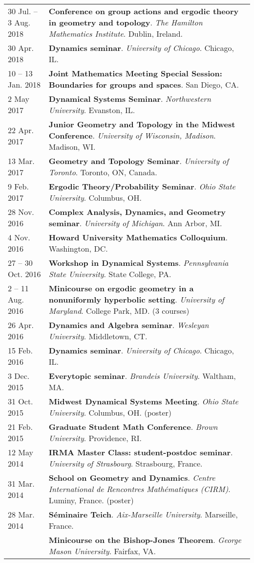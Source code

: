 \begin{center}
{\begin{longtable}{p{}  p{}}
30 Jul.  -- 3 Aug.  2018 & \textbf{Conference on group actions and ergodic theory in geometry and topology}. \textit{The Hamilton Mathematics Institute}.  Dublin, Ireland.  \\ 
30 Apr.  2018 & \textbf{Dynamics seminar}. \textit{University of Chicago}.  Chicago, IL.  \\ 
10  -- 13 Jan.  2018 & \textbf{Joint Mathematics Meeting Special Session: Boundaries for groups and spaces}.  San Diego, CA.  \\ 
2 May  2017 & \textbf{Dynamical Systems Seminar}. \textit{Northwestern University}.  Evanston, IL.  \\ 
22 Apr.  2017 & \textbf{Junior Geometry and Topology in the Midwest Conference}. \textit{University of Wisconsin, Madison}.  Madison, WI.  \\ 
13 Mar.  2017 & \textbf{Geometry and Topology Seminar}. \textit{University of Toronto}.  Toronto, ON, Canada.  \\ 
9 Feb.  2017 & \textbf{Ergodic Theory/Probability Seminar}. \textit{Ohio State University}.  Columbus, OH.  \\ 
28 Nov.  2016 & \textbf{Complex Analysis, Dynamics, and Geometry seminar}. \textit{University of Michigan}.  Ann Arbor, MI.  \\ 
4 Nov.  2016 & \textbf{Howard University Mathematics Colloquium}.  Washington, DC.  \\ 
27  -- 30 Oct.  2016 & \textbf{Workshop in Dynamical Systems}. \textit{Pennsylvania State University}.  State College, PA.  \\ 
2  -- 11 Aug.  2016 & \textbf{Minicourse on ergodic geometry in a nonuniformly hyperbolic setting}. \textit{University of Maryland}.  College Park, MD. (3 courses) \\ 
26 Apr.  2016 & \textbf{Dynamics and Algebra seminar}. \textit{Wesleyan University}.  Middletown, CT.  \\ 
15 Feb.  2016 & \textbf{Dynamics seminar}. \textit{University of Chicago}.  Chicago, IL.  \\ 
3 Dec.  2015 & \textbf{Everytopic seminar}. \textit{Brandeis University}.  Waltham, MA.  \\ 
31 Oct.  2015 & \textbf{Midwest Dynamical Systems Meeting}. \textit{Ohio State University}.  Columbus, OH. (poster) \\ 
21 Feb.  2015 & \textbf{Graduate Student Math Conference}. \textit{Brown University}.  Providence, RI.  \\ 
12 May  2014 & \textbf{IRMA Master Class: student-postdoc seminar}. \textit{University of Strasbourg}.  Strasbourg, France.  \\ 
31 Mar.  2014 & \textbf{School on Geometry and Dynamics}. \textit{Centre International de Rencontres Math\'ematiques (CIRM)}.  Luminy, France. (poster) \\ 
28 Mar.  2014 & \textbf{S\'eminaire Teich}. \textit{Aix-Marseille University}.  Marseille, France.  \\ 
  & \textbf{Minicourse on the Bishop-Jones Theorem}. \textit{George Mason University}.  Fairfax, VA.  
    \end{longtable}
    } 
    \end{center}

